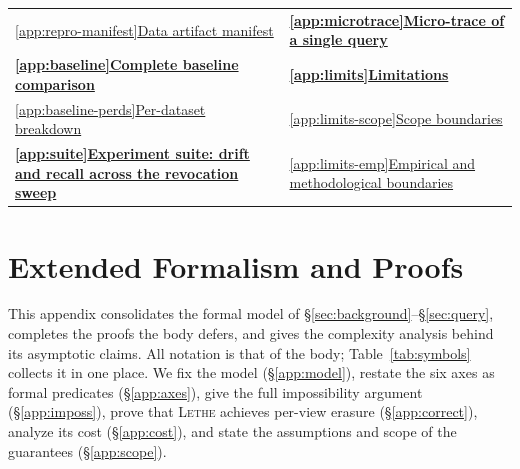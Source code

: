 \documentclass[sigconf, nonacm, review]{acmart}
\begin{document}
\begin{strip}
\begin{tabular}{@{}p{}p{}@{}}
\hspace*{1.2em}\hyperref[app:repro-manifest]{\ref*{app:repro-manifest}\hspace{0.5em}Data artifact manifest} & \hyperref[app:microtrace]{\textbf{\ref*{app:microtrace}}\hspace{0.5em}\textbf{Micro-trace of a single query}} \\
\hyperref[app:baseline]{\textbf{\ref*{app:baseline}}\hspace{0.5em}\textbf{Complete baseline comparison}} & \hyperref[app:limits]{\textbf{\ref*{app:limits}}\hspace{0.5em}\textbf{Limitations}} \\
\hspace*{1.2em}\hyperref[app:baseline-perds]{\ref*{app:baseline-perds}\hspace{0.5em}Per-dataset breakdown} & \hspace*{1.2em}\hyperref[app:limits-scope]{\ref*{app:limits-scope}\hspace{0.5em}Scope boundaries} \\
\hyperref[app:suite]{\textbf{\ref*{app:suite}}\hspace{0.5em}\textbf{Experiment suite: drift and recall across the revocation sweep}} & \hspace*{1.2em}\hyperref[app:limits-emp]{\ref*{app:limits-emp}\hspace{0.5em}Empirical and methodological boundaries} \\
\bottomrule
\end{tabular}
\vspace{6pt}
\end{strip}

\section{Extended Formalism and Proofs}
\label{app:formal}

This appendix consolidates the formal model of
\S\ref{sec:background}--\S\ref{sec:query}, completes the proofs the body
defers, and gives the complexity analysis behind its asymptotic claims. All
notation is that of the body; Table~\ref{tab:symbols} collects it in one
place. We fix the model (\S\ref{app:model}), restate the six axes as formal
predicates (\S\ref{app:axes}), give the full impossibility argument
(\S\ref{app:imposs}), prove that \textsc{Lethe} achieves per-view erasure
(\S\ref{app:correct}), analyze its cost (\S\ref{app:cost}), and state the
assumptions and scope of the guarantees (\S\ref{app:scope}).
\end{document}
